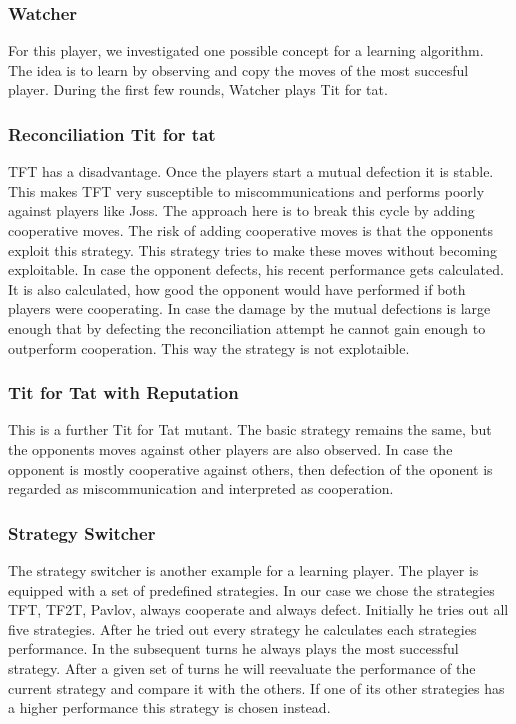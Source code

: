 \documentclass[11pt,twoside]{article}
\begin{document}
\subsubsection{Watcher}
For this player, we investigated one possible concept for a learning algorithm. The idea is to learn by observing and copy the moves of the most succesful player. 
During the first few rounds, Watcher plays Tit for tat. 

\subsubsection{Reconciliation Tit for tat}
TFT has a disadvantage. Once the players start a mutual defection it is stable. This makes TFT very susceptible to miscommunications and performs poorly against players like Joss. The approach here is to break this cycle by adding cooperative moves. The risk of adding cooperative moves is that the opponents exploit this strategy.
This strategy tries to make these moves without becoming exploitable. In case the opponent defects, his recent performance gets calculated. It is also calculated, how good the opponent would have performed if both players were cooperating. In case the damage by the mutual defections is large enough that by defecting the reconciliation attempt he cannot gain enough to outperform cooperation. This way the strategy is not explotaible.

\subsubsection{Tit for Tat with Reputation}
This is a further Tit for Tat  mutant. The basic strategy remains the same, but the opponents moves against other players are also observed. In case the opponent is mostly cooperative against others, then defection of the oponent is regarded as miscommunication and interpreted as cooperation. 

\subsubsection{Strategy Switcher}
The strategy switcher is another example for a learning player. The player is equipped with a set of predefined strategies. In our case we chose the strategies TFT, TF2T, Pavlov, always cooperate and always defect. Initially he tries out all five strategies. After he tried out every strategy he calculates each strategies performance. In the subsequent turns he always plays the most successful strategy. After a given set of turns he will reevaluate the performance of the current strategy and compare it with the others. If one of its other strategies has a higher performance this strategy is chosen instead.
\end{document}
